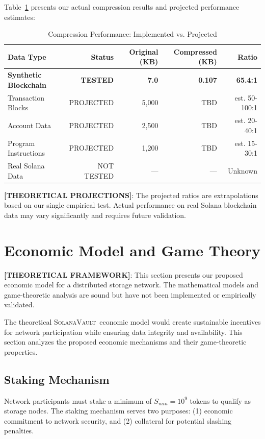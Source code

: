 \documentclass[11pt,a4paper]{article}
\newcommand{\SolanaVault}{\textsc{SolanaVault}}
\begin{document}
Table~\ref{tab:compression_results} presents our actual compression results and projected performance estimates:

\begin{table}[H]
\centering
\caption{Compression Performance: Implemented vs. Projected}
\label{tab:compression_results}
\begin{tabular}{@{}lrrrr@{}}
\toprule
Data Type & Status & Original (KB) & Compressed (KB) & Ratio \\
\midrule
\textbf{Synthetic Blockchain} & \textbf{TESTED} & \textbf{7.0} & \textbf{0.107} & \textbf{65.4:1} \\
Transaction Blocks & PROJECTED & 5,000 & TBD & est. 50-100:1 \\
Account Data & PROJECTED & 2,500 & TBD & est. 20-40:1 \\
Program Instructions & PROJECTED & 1,200 & TBD & est. 15-30:1 \\
Real Solana Data & NOT TESTED & --- & --- & Unknown \\
\bottomrule
\end{tabular}
\end{table}

\textbf{[THEORETICAL PROJECTIONS]}: The projected ratios are extrapolations based on our single empirical test. Actual performance on real Solana blockchain data may vary significantly and requires future validation.

\section{Economic Model and Game Theory}
\label{sec:economics}

\textbf{[THEORETICAL FRAMEWORK]}: This section presents our proposed economic model for a distributed storage network. The mathematical models and game-theoretic analysis are sound but have not been implemented or empirically validated.

The theoretical \SolanaVault\ economic model would create sustainable incentives for network participation while ensuring data integrity and availability. This section analyzes the proposed economic mechanisms and their game-theoretic properties.

\subsection{Staking Mechanism}

Network participants must stake a minimum of $S_{min} = 10^9$ tokens to qualify as storage nodes. The staking mechanism serves two purposes: (1) economic commitment to network security, and (2) collateral for potential slashing penalties.
\end{document}
